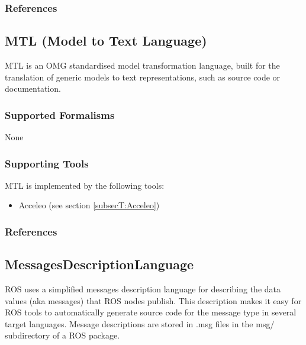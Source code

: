 \subsubsection{References}





\subsection{MTL (Model to Text Language)}
\label{subsecL:MTL}

MTL is an OMG standardised model transformation language, built for the translation of generic models to text representations, such as source code or documentation.

\subsubsection{Supported Formalisms}

None


\subsubsection{Supporting Tools}

MTL is implemented by the following tools:
\begin{itemize}
	\item Acceleo (see section \ref{subsecT:Acceleo})
\end{itemize}


\subsubsection{References}





\subsection{MessagesDescriptionLanguage}
\label{subsecL:MessagesDescriptionLanguage}


ROS uses a simplified messages description language for describing the data values (aka messages) that ROS nodes publish. This description makes it easy for ROS tools to automatically generate source code for the message type in several target languages. Message descriptions are stored in .msg files in the msg/ subdirectory of a ROS package.

